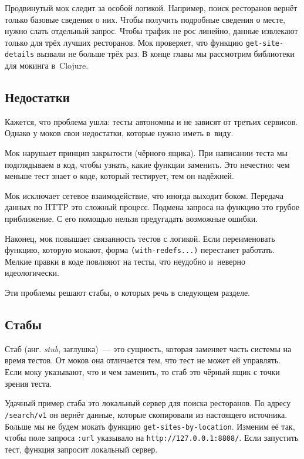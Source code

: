 Продвинутый мок следит за особой логикой. Например, поиск ресторанов вернёт
только базовые сведения о них. Чтобы получить подробные сведения о месте, нужно
слать отдельный запрос. Чтобы трафик не рос линейно, данные извлекают только для
трёх лучших ресторанов. Мок проверяет, что функцию \verb|get-site-details|
вызвали не больше трёх раз. В конце главы мы рассмотрим библиотеки для мокинга
в~Clojure.

\subsection{Недостатки}

Кажется, что проблема ушла: тесты автономны и не зависят от третьих
сервисов. Однако у моков свои недостатки, которые нужно иметь в~виду.

Мок нарушает принцип закрытости (чёрного ящика). При написании теста мы
подглядываем в код, чтобы узнать, какие функции заменить. Это нечестно: чем
меньше тест знает о коде, который тестирует, тем он надёжней.

Мок исключает сетевое взаимодействие, что иногда выходит боком. Передача данных
по HTTP это сложный процесс. Подмена запроса на функцию это грубое
приближение. С его помощью нельзя предугадать возможные ошибки.

Наконец, мок повышает связанность тестов с логикой. Если переименовать функцию,
которую мокают, форма \verb|(with-redefs...)| перестанет работать. Мелкие правки
в коде повлияют на тесты, что неудобно и~неверно идеологически.

Эти проблемы решают стабы, о которых речь в следующем разделе.

\subsection{Стабы}


Стаб (анг. \emph{stub}, заглушка)~--- это сущность, которая заменяет часть
системы на время тестов. От моков она отличается тем, что тест не может ей
управлять. Если моку указывают, что и чем заменить, то стаб это чёрный ящик с
точки зрения теста.

Удачный пример стаба это локальный сервер для поиска ресторанов. По адресу
\verb|/search/v1| он вернёт данные, которые скопировали из настоящего
источника. Больше мы не будем мокать функцию \verb|get-sites-by-location|.
Изменим её так, чтобы поле запроса \verb|:url| указывало на \verb|http://127.0.0.1:8808/|.
Если запустить тест, функция запросит локальный сервер.

